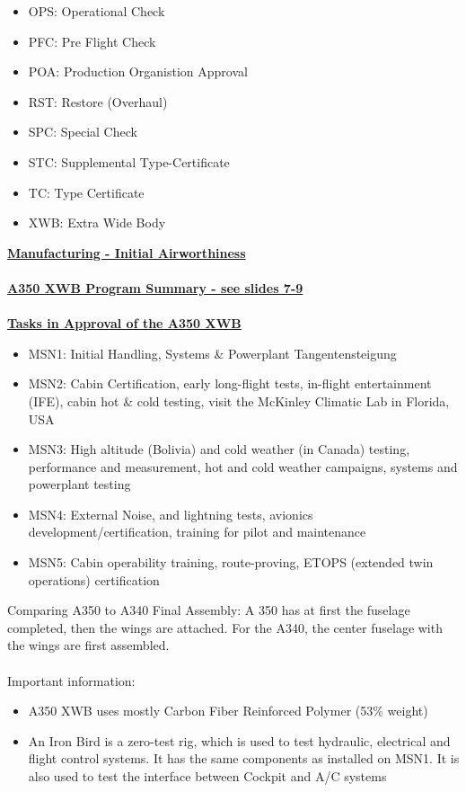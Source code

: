 \documentclass[9pt, landscape, fleqn]{scrartcl}
\begin{document}
\begin{multicols*}{3}
\begin{itemize}
    \item OPS: Operational Check  
    \item PFC: Pre Flight Check
    \item POA: Production Organistion Approval 
    \item RST: Restore (Overhaul)
    \item SPC: Special Check 
    \item STC: Supplemental Type-Certificate 
    \item TC: Type Certificate 
    \item XWB: Extra Wide Body
\end{itemize}
\underline{\textbf{Manufacturing - Initial Airworthiness}} \\ \\
\underline{\textbf{A350 XWB Program Summary - see slides 7-9 }} \\ \\
\underline{\textbf{Tasks in Approval of the A350 XWB}}
\begin{itemize}
    \item MSN1: Initial Handling, Systems \& Powerplant Tangentensteigung
    \item MSN2: Cabin Certification, early long-flight tests, in-flight entertainment (IFE), cabin hot \& cold testing, visit the McKinley Climatic Lab in Florida, USA
    \item MSN3: High altitude (Bolivia) and cold weather (in Canada) testing, performance and measurement, hot and cold weather campaigns, systems and powerplant testing 
    \item MSN4: External Noise, and lightning tests, avionics development/certification, training for pilot and maintenance 
    \item MSN5: Cabin operability training, route-proving, ETOPS (extended twin operations) certification
\end{itemize}
Comparing A350 to A340 Final Assembly: A 350 has at first the fuselage completed, then the wings are attached. For the A340, the center fuselage with the wings are first assembled. \\ \\
Important information:
\begin{itemize}
    \item A350 XWB uses mostly Carbon Fiber Reinforced Polymer (53\% weight)
    \item An Iron Bird is a zero-test rig, which is used to test hydraulic, electrical and flight control systems. It has the same components as installed on MSN1. It is also used to test the interface between Cockpit and A/C systems

\end{itemize}
\end{multicols*}
\end{document}

